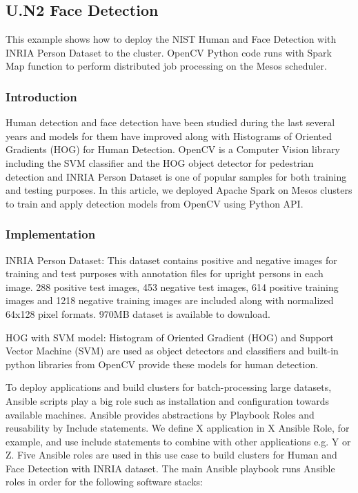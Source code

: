 

\subsection{U.N2 Face Detection}

This example shows how to deploy the NIST Human and Face Detection with INRIA
Person Dataset to the cluster. OpenCV Python code runs with Spark Map function
to perform distributed job processing on the Mesos scheduler.

\subsubsection{Introduction}
Human detection and face detection have been studied during the last several
years and models for them have improved along with Histograms of Oriented
Gradients (HOG) for Human Detection. OpenCV is a Computer Vision library
including the SVM classifier and the HOG object detector for pedestrian
detection and INRIA Person Dataset is one of popular samples for both
training and testing purposes. In this article, we deployed Apache Spark on
Mesos clusters to train and apply detection models from OpenCV using Python
API.

\subsubsection{Implementation}
INRIA Person Dataset: This dataset contains positive and negative images for
training and test purposes with annotation files for upright persons in each
image. 288 positive test images, 453 negative test images, 614 positive
training images and 1218 negative training images are included along with
normalized 64x128 pixel formats. 970MB dataset is available to download.

HOG with SVM model: Histogram of Oriented Gradient (HOG) and Support Vector
Machine (SVM) are used as object detectors and classifiers and built-in python
libraries from OpenCV provide these models for human detection.

To deploy applications and build clusters for batch-processing large
datasets, Ansible scripts play a big role such as installation and
configuration towards available machines. Ansible provides abstractions by
Playbook Roles and reusability by Include statements. We define X application
in X Ansible Role, for example, and use include statements to combine with
other applications e.g. Y or Z. Five Ansible roles are used in this use case to
build clusters for Human and Face Detection with INRIA dataset. 
The main Ansible playbook runs Ansible roles in order for the following
software stacks:

